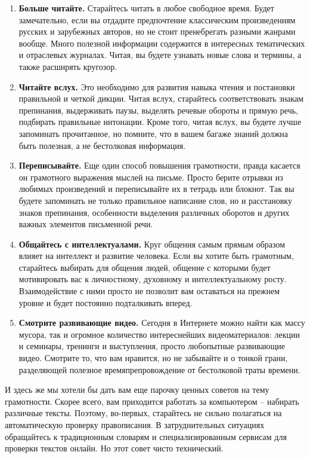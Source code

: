\begin{enumerate}
    \item \textbf{Больше читайте.} Старайтесь читать в любое свободное время. Будет замечательно, если вы отдадите предпочтение классическим произведениям русских и зарубежных авторов, но не стоит пренебрегать разными жанрами вообще. Много полезной информации содержится в интересных тематических и отраслевых журналах. Читая, вы будете узнавать новые слова и термины, а также расширять кругозор.
    \item \textbf{Читайте вслух.} Это необходимо для развития навыка чтения и постановки правильной и четкой дикции. Читая вслух, старайтесь соответствовать знакам препинания, выдерживать паузы, выделять речевые обороты и прямую речь, подбирать правильные интонации. Кроме того, читая вслух, вы будете лучше запоминать прочитанное, но помните, что в вашем багаже знаний должна быть полезная, а не бестолковая информация.
    \item \textbf{Переписывайте.} Еще один способ повышения грамотности, правда касается он грамотного выражения мыслей на письме. Просто берите отрывки из любимых произведений и переписывайте их в тетрадь или блокнот. Так вы будете запоминать не только правильное написание слов, но и расстановку знаков препинания, особенности выделения различных оборотов и других важных элементов письменной речи.
    \item \textbf{Общайтесь с интеллектуалами.} Круг общения самым прямым образом влияет на интеллект и развитие человека. Если вы хотите быть грамотным, старайтесь выбирать для общения людей, общение с которыми будет мотивировать вас к личностному, духовному и интеллектуальному росту. Взаимодействие с ними просто не позволит вам оставаться на прежнем уровне и будет постоянно подталкивать вперед.
    \item \textbf{Смотрите развивающие видео.} Сегодня в Интернете можно найти как массу мусора, так и огромное количество интереснейших видеоматериалов: лекции и семинары, тренинги и выступления, просто любопытные развивающие видео. Смотрите то, что вам нравится, но не забывайте и о тонкой грани, разделяющей полезное времяпрепровождение от бестолковой траты времени.
\end{enumerate}

И здесь же мы хотели бы дать вам еще парочку ценных советов на тему грамотности. Скорее всего, вам приходится работать за компьютером – набирать различные тексты. Поэтому, во-первых, старайтесь не сильно полагаться на автоматическую проверку правописания. В затруднительных ситуациях обращайтесь к традиционным словарям и специализированным сервисам для проверки текстов онлайн. Но этот совет чисто технический.

